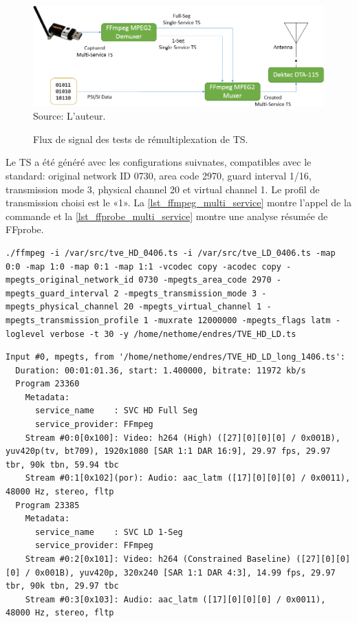 \documentclass[12pt,a4paper]{article}
\begin{document}
\begin{figure}[!h]
\centering
\caption{Flux de signal des tests de rémultiplexation de TS.}
\includegraphics[width=0.8\linewidth]{pictures/test_scn_muxing.png}
\\Source: L'auteur.
\label{fig:test_scn_muxing}
\end{figure}

Le TS a été généré avec les configurations suivnates, compatibles avec le standard: original network ID 0730, area code 2970, guard interval 1/16, transmission mode 3, physical channel 20 et virtual channel 1. Le profil de transmission choisi est le «1». La \autoref{lst_ffmpeg_multi_service} montre l'appel de la commande et la \autoref{lst_ffprobe_multi_service} montre une analyse résumée de FFprobe.

\begin{minipage}{\linewidth}
\begin{lstlisting}[caption={FFmpeg command-line call to generate a multi-service TS}, label={lst_ffmpeg_multi_service}]
./ffmpeg -i /var/src/tve_HD_0406.ts -i /var/src/tve_LD_0406.ts -map 0:0 -map 1:0 -map 0:1 -map 1:1 -vcodec copy -acodec copy -mpegts_original_network_id 0730 -mpegts_area_code 2970 -mpegts_guard_interval 2 -mpegts_transmission_mode 3 -mpegts_physical_channel 20 -mpegts_virtual_channel 1 -mpegts_transmission_profile 1 -muxrate 12000000 -mpegts_flags latm -loglevel verbose -t 30 -y /home/nethome/endres/TVE_HD_LD.ts
\end{lstlisting}
\end{minipage}

\begin{minipage}{\linewidth}
\begin{lstlisting}[caption={FFprobe analysing the multi-service TS.}, label={lst_ffprobe_multi_service}]
Input #0, mpegts, from '/home/nethome/endres/TVE_HD_LD_long_1406.ts':
  Duration: 00:01:01.36, start: 1.400000, bitrate: 11972 kb/s
  Program 23360 
    Metadata:
      service_name    : SVC HD Full Seg
      service_provider: FFmpeg
    Stream #0:0[0x100]: Video: h264 (High) ([27][0][0][0] / 0x001B), yuv420p(tv, bt709), 1920x1080 [SAR 1:1 DAR 16:9], 29.97 fps, 29.97 tbr, 90k tbn, 59.94 tbc
    Stream #0:1[0x102](por): Audio: aac_latm ([17][0][0][0] / 0x0011), 48000 Hz, stereo, fltp
  Program 23385 
    Metadata:
      service_name    : SVC LD 1-Seg
      service_provider: FFmpeg
    Stream #0:2[0x101]: Video: h264 (Constrained Baseline) ([27][0][0][0] / 0x001B), yuv420p, 320x240 [SAR 1:1 DAR 4:3], 14.99 fps, 29.97 tbr, 90k tbn, 29.97 tbc
    Stream #0:3[0x103]: Audio: aac_latm ([17][0][0][0] / 0x0011), 48000 Hz, stereo, fltp
\end{lstlisting}
\end{minipage}
\end{document}
